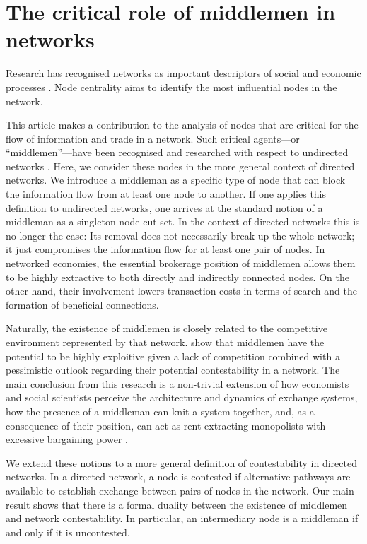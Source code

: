 \documentclass[11pt,fleqn]{article}
\begin{document}
\section{The critical role of middlemen in networks}

Research has recognised networks as important descriptors of social and economic processes \citep{Watts2004, Jackson2008, Newman2010, Barabasi2016}. Node centrality aims to identify the most influential nodes in the network.

This article makes a contribution to the analysis of nodes that are critical for the flow of information and trade in a network. Such critical agents---or ``middlemen''---have been recognised and researched with respect to undirected networks \citep{Burt1992}. Here, we consider these nodes in the more general context of directed networks. We introduce a middleman as a specific type of node that can block the information flow from at least one node to another. If one applies this definition to undirected networks, one arrives at the standard notion of a middleman as a singleton node cut set. In the context of directed networks this is no longer the case: Its removal does not necessarily break up the whole network; it just compromises the information flow for at least one pair of nodes. In networked economies, the essential brokerage position of middlemen allows them to be highly extractive to both directly and indirectly connected nodes. On the other hand, their involvement lowers transaction costs in terms of search and the formation of beneficial connections.

Naturally, the existence of middlemen is closely related to the competitive environment represented by that network. \citet{GillesDiamantaris2013} show that middlemen have the potential to be highly exploitive given a lack of competition combined with a pessimistic outlook regarding their potential contestability in a network. The main conclusion from this research is a non-trivial extension of how economists and social scientists perceive the architecture and dynamics of exchange systems, how the presence of a middleman can knit a system together, and, as a consequence of their position, can act as rent-extracting monopolists with excessive bargaining power \citep[Chapter~11]{EasleyKleinberg2010}.

We extend these notions to a more general definition of contestability in directed networks. In a directed network, a node is contested if alternative pathways are available to establish exchange between pairs of nodes in the network. Our main result shows that there is a formal duality between the existence of middlemen and network contestability. In particular, an intermediary node is a middleman if and only if it is uncontested.
\end{document}
